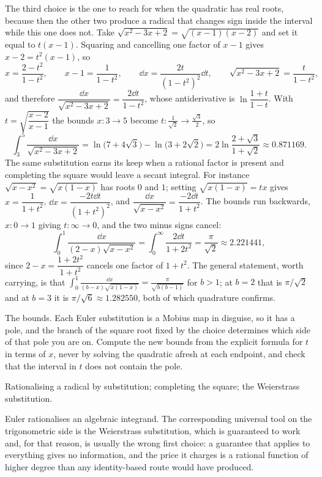 The third choice is the one to reach for when the quadratic has real roots, because then the other two produce a radical that changes sign inside the interval while this one does not. Take $\sqrt{x^2-3x+2}=\sqrt{(x-1)(x-2)}$ and set it equal to $t(x-1)$. Squaring and cancelling one factor of $x-1$ gives $x-2=t^2(x-1)$, so
\[
x=\frac{2-t^2}{1-t^2},\qquad x-1=\frac{1}{1-t^2},\qquad \dd x=\frac{2t}{(1-t^2)^2}\dd t,\qquad \sqrt{x^2-3x+2}=\frac{t}{1-t^2},
\]
and therefore $\dfrac{\dd x}{\sqrt{x^2-3x+2}}=\dfrac{2\dd t}{1-t^2}$, whose antiderivative is $\ln\dfrac{1+t}{1-t}$. With $t=\sqrt{\dfrac{x-2}{x-1}}$ the bounds $x:3\to5$ become $t:\tfrac{1}{\sqrt2}\to\tfrac{\sqrt3}{2}$, so
\[
\int_3^5\frac{\dd x}{\sqrt{x^2-3x+2}}=\ln\bigl(7+4\sqrt3\bigr)-\ln\bigl(3+2\sqrt2\bigr)=2\ln\frac{2+\sqrt3}{1+\sqrt2}\approx0.871169 .
\]
The same substitution earns its keep when a rational factor is present and completing the square would leave a secant integral. For instance $\sqrt{x-x^2}=\sqrt{x(1-x)}$ has roots $0$ and $1$; setting $\sqrt{x(1-x)}=tx$ gives $x=\dfrac{1}{1+t^2}$, $\dd x=\dfrac{-2t\dd t}{(1+t^2)^2}$, and $\dfrac{\dd x}{\sqrt{x-x^2}}=\dfrac{-2\dd t}{1+t^2}$. The bounds run backwards, $x:0\to1$ giving $t:\infty\to0$, and the two minus signs cancel:
\[
\int_0^1\frac{\dd x}{(2-x)\sqrt{x-x^2}}=\int_0^{\infty}\frac{2\dd t}{1+2t^2}=\frac{\pi}{\sqrt2}\approx2.221441 ,
\]
since $2-x=\dfrac{1+2t^2}{1+t^2}$ cancels one factor of $1+t^2$. The general statement, worth carrying, is that $\displaystyle\int_0^1\frac{\dd x}{(b-x)\sqrt{x(1-x)}}=\frac{\pi}{\sqrt{b(b-1)}}$ for $b>1$; at $b=2$ that is $\pi/\sqrt2$ and at $b=3$ it is $\pi/\sqrt6\approx1.282550$, both of which quadrature confirms.

\begin{trap}
The bounds. Each Euler substitution is a Mobius map in disguise, so it has a pole, and the branch of the square root fixed by the choice determines which side of that pole you are on. Compute the new bounds from the explicit formula for $t$ in terms of $x$, never by solving the quadratic afresh at each endpoint, and check that the interval in $t$ does not contain the pole.
\end{trap}

\begin{seealsob}Rationalising a radical by substitution; completing the square; the Weierstrass substitution.\end{seealsob}

Euler rationalises an algebraic integrand. The corresponding universal tool on the trigonometric side is the Weierstrass substitution, which is guaranteed to work and, for that reason, is usually the wrong first choice: a guarantee that applies to everything gives no information, and the price it charges is a rational function of higher degree than any identity-based route would have produced.

